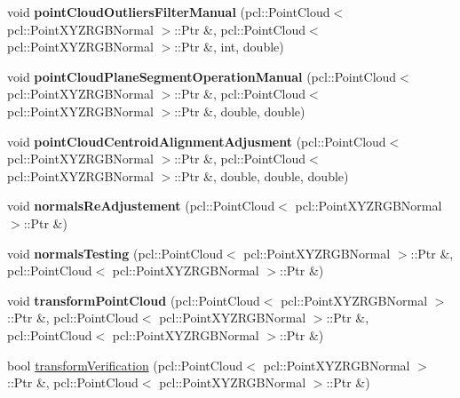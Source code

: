 \begin{DoxyCompactItemize}
\item 
\mbox{\label{classReconstruction_ac7cff09bc04f6579b54932df8eb9b6ab}} 
void {\bfseries point\+Cloud\+Outliers\+Filter\+Manual} (pcl\+::\+Point\+Cloud$<$ pcl\+::\+Point\+X\+Y\+Z\+R\+G\+B\+Normal $>$\+::Ptr \&, pcl\+::\+Point\+Cloud$<$ pcl\+::\+Point\+X\+Y\+Z\+R\+G\+B\+Normal $>$\+::Ptr \&, int, double)
\item 
\mbox{\label{classReconstruction_a621af3745966b359e10c02a570658c5c}} 
void {\bfseries point\+Cloud\+Plane\+Segment\+Operation\+Manual} (pcl\+::\+Point\+Cloud$<$ pcl\+::\+Point\+X\+Y\+Z\+R\+G\+B\+Normal $>$\+::Ptr \&, pcl\+::\+Point\+Cloud$<$ pcl\+::\+Point\+X\+Y\+Z\+R\+G\+B\+Normal $>$\+::Ptr \&, double, double)
\item 
\mbox{\label{classReconstruction_a0c9482066c467e769715d5ffde762225}} 
void {\bfseries point\+Cloud\+Centroid\+Alignment\+Adjusment} (pcl\+::\+Point\+Cloud$<$ pcl\+::\+Point\+X\+Y\+Z\+R\+G\+B\+Normal $>$\+::Ptr \&, pcl\+::\+Point\+Cloud$<$ pcl\+::\+Point\+X\+Y\+Z\+R\+G\+B\+Normal $>$\+::Ptr \&, double, double, double)
\item 
\mbox{\label{classReconstruction_adbc413f7611f3984cbfcff77b9c23df6}} 
void {\bfseries normals\+Re\+Adjustement} (pcl\+::\+Point\+Cloud$<$ pcl\+::\+Point\+X\+Y\+Z\+R\+G\+B\+Normal $>$\+::Ptr \&)
\item 
\mbox{\label{classReconstruction_ab8b679093ca295de818b4bdf84ec79af}} 
void {\bfseries normals\+Testing} (pcl\+::\+Point\+Cloud$<$ pcl\+::\+Point\+X\+Y\+Z\+R\+G\+B\+Normal $>$\+::Ptr \&, pcl\+::\+Point\+Cloud$<$ pcl\+::\+Point\+X\+Y\+Z\+R\+G\+B\+Normal $>$\+::Ptr \&)
\item 
\mbox{\label{classReconstruction_a74cf80cebcf9600860881f57a8986823}} 
void {\bfseries transform\+Point\+Cloud} (pcl\+::\+Point\+Cloud$<$ pcl\+::\+Point\+X\+Y\+Z\+R\+G\+B\+Normal $>$\+::Ptr \&, pcl\+::\+Point\+Cloud$<$ pcl\+::\+Point\+X\+Y\+Z\+R\+G\+B\+Normal $>$\+::Ptr \&, pcl\+::\+Point\+Cloud$<$ pcl\+::\+Point\+X\+Y\+Z\+R\+G\+B\+Normal $>$\+::Ptr \&)
\item 
bool \hyperlink{classReconstruction_a73c384d0419386505e5fe58a55b556c9}{transform\+Verification} (pcl\+::\+Point\+Cloud$<$ pcl\+::\+Point\+X\+Y\+Z\+R\+G\+B\+Normal $>$\+::Ptr \&, pcl\+::\+Point\+Cloud$<$ pcl\+::\+Point\+X\+Y\+Z\+R\+G\+B\+Normal $>$\+::Ptr \&)
\end{DoxyCompactItemize}


